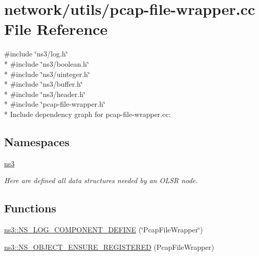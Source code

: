 \hypertarget{pcap-file-wrapper_8cc}{}\section{network/utils/pcap-\/file-\/wrapper.cc File Reference}
\label{pcap-file-wrapper_8cc}
{\ttfamily \#include \char`\"{}ns3/log.\+h\char`\"{}}\\*
{\ttfamily \#include \char`\"{}ns3/boolean.\+h\char`\"{}}\\*
{\ttfamily \#include \char`\"{}ns3/uinteger.\+h\char`\"{}}\\*
{\ttfamily \#include \char`\"{}ns3/buffer.\+h\char`\"{}}\\*
{\ttfamily \#include \char`\"{}ns3/header.\+h\char`\"{}}\\*
{\ttfamily \#include \char`\"{}pcap-\/file-\/wrapper.\+h\char`\"{}}\\*
Include dependency graph for pcap-\/file-\/wrapper.cc\+:
\subsection*{Namespaces}
\begin{DoxyCompactItemize}
\item 
 \hyperlink{namespacens3}{ns3}
\begin{DoxyCompactList}\small\item\em Here are defined all data structures needed by an O\+L\+SR node. \end{DoxyCompactList}\end{DoxyCompactItemize}
\subsection*{Functions}
\begin{DoxyCompactItemize}
\item 
\hyperlink{namespacens3_a78183f4e9c19f3cf14c2aa989cccdf0c}{ns3\+::\+N\+S\+\_\+\+L\+O\+G\+\_\+\+C\+O\+M\+P\+O\+N\+E\+N\+T\+\_\+\+D\+E\+F\+I\+NE} (\char`\"{}Pcap\+File\+Wrapper\char`\"{})
\item 
\hyperlink{namespacens3_ac261fab88b17f9532c98c5aab3fddae3}{ns3\+::\+N\+S\+\_\+\+O\+B\+J\+E\+C\+T\+\_\+\+E\+N\+S\+U\+R\+E\+\_\+\+R\+E\+G\+I\+S\+T\+E\+R\+ED} (Pcap\+File\+Wrapper)
\end{DoxyCompactItemize}
